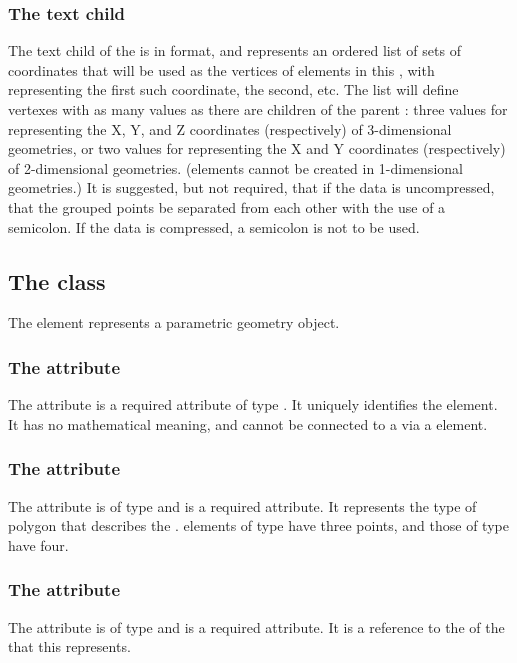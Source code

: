 \subsubsection{The \fixttspace{} text child}
The  text child of the \SpatialPoints is in  format, and represents an ordered list of sets of coordinates that will be used as the vertices of \ParametricObject elements in this \ParametricGeometry, with  representing the first such coordinate,  the second, etc.  The list will define vertexes with as many values as there are \CoordinateComponent children of the parent \Geometry:  three values for representing the X, Y, and Z coordinates (respectively) of 3-dimensional geometries, or two values for representing the X and Y coordinates (respectively) of 2-dimensional geometries.  (\ParametricGeometry elements cannot be created in 1-dimensional geometries.)  It is suggested, but not required, that if the data is uncompressed, that the grouped points be separated from each other with the use of a semicolon.  If the data is compressed, a semicolon is not to be used.


\subsection{The  class}
\label{parametricobject-class}
The \ParametricObject element represents a parametric geometry object. 

\subsubsection{The \fixttspace{} attribute}
The  attribute is a required attribute of type . It uniquely identifies the \ParametricObject element.  It has no mathematical meaning, and cannot be connected to a \Parameter via a \SpatialSymbolReference element.

\subsubsection{The \fixttspace{} attribute}
The  attribute is of type  and is a required attribute. It represents the type of polygon that describes the \ParametricObject.  \ParametricObject elements of type  have three points, and those of type  have four.

\subsubsection{The \fixttspace{} attribute}
The  attribute is of type  and is a required attribute. It is a reference to the  of the \DomainType that this \ParametricObject represents.

